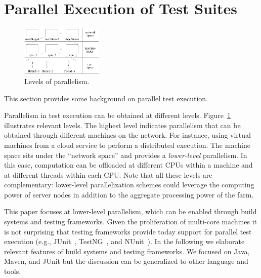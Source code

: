 \section{Parallel Execution of Test Suites}
\label{sec:modes}

\begin{figure}[t!]
  \centering
  \includegraphics[width=0.35\textwidth]{figs/parallel-levels.pdf}
  \vspace{-1ex}
  \caption{\label{fig:levels}Levels of parallelism.}
\end{figure}


This section provides some background on parallel test execution.

Parallelism in test execution can be obtained at different levels.
Figure~\ref{fig:levels} illustrates relevant levels.  The highest
level indicates parallelism that can be obtained through different
machines on the network.  For instance, using virtual machines from a
cloud service to perform a distributed execution.  The machine space
sits under the ``network space'' and provides a \emph{lower-level}
parallelism.  In this case, computation can be offloaded at different
CPUs within a machine and at different threads within each CPU.  Note
that all these levels are complementary:  lower-level parallelization
schemes could leverage the computing power of server nodes in addition
to the aggregate processing power of the farm.


This paper focuses at lower-level parallelism, which can be enabled
through build systems and testing frameworks.  Given the proliferation
of multi-core machines it is not surprising that testing frameworks
provide today support for parallel test execution (e.g.,
JUnit~\cite{junit-org}, TestNG~\cite{testng}, and NUnit~\cite{nunit}).
In the following we elaborate relevant features of build systems and
testing frameworks.  We focused on Java, Maven, and JUnit but the
discussion can be generalized to other language and tools.

